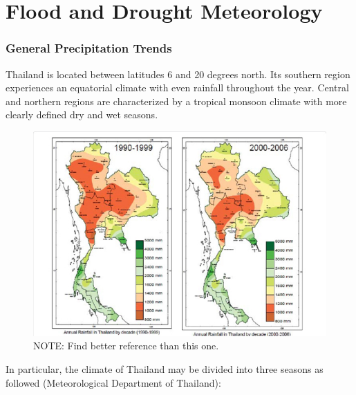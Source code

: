 \section{Flood and Drought Meteorology}

\subsubsection{General Precipitation Trends}

Thailand is located between latitudes 6 and 20 degrees north. Its southern region experiences an equatorial climate with even rainfall throughout the year. Central and northern regions are characterized by a tropical monsoon climate with more clearly defined dry and wet seasons. 

\begin{figure}[htbp]
	\centering
		\includegraphics[width=1.00\textwidth]{graphics/Annual_Rainfall_Thailand.jpg}
	\caption{NOTE: Find better reference than this one.}
	\label{fig:Annual_Rainfall_Thailand}
\end{figure}

In particular, the climate of Thailand may be divided into three seasons as followed (Meteorological Department of Thailand):  

